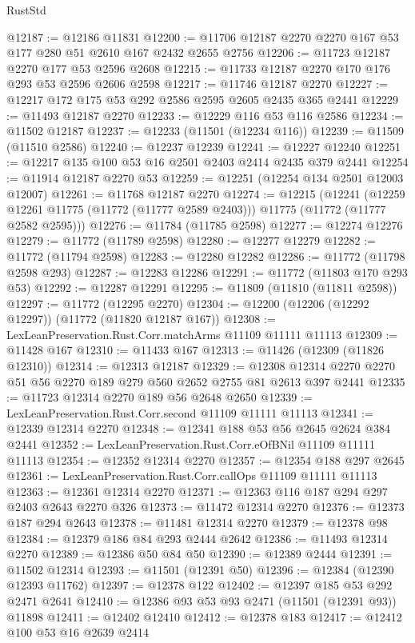 \begin{lexlean}{RustStd}
\begin{coremodule}
@12187 := @12186 @11831
@12200 := @11706 @12187 @2270 @2270 @167 @53 @177 @280 @51 @2610 @167 @2432 @2655 @2756
@12206 := @11723 @12187 @2270 @177 @53 @2596 @2608
@12215 := @11733 @12187 @2270 @170 @176 @293 @53 @2596 @2606 @2598
@12217 := @11746 @12187 @2270
@12227 := @12217 @172 @175 @53 @292 @2586 @2595 @2605 @2435 @365 @2441
@12229 := @11493 @12187 @2270
@12233 := @12229 @116 @53 @116 @2586
@12234 := @11502 @12187
@12237 := @12233 (@11501 (@12234 @116))
@12239 := @11509 (@11510 @2586)
@12240 := @12237 @12239
@12241 := @12227 @12240
@12251 := @12217 @135 @100 @53 @16 @2501 @2403 @2414 @2435 @379 @2441
@12254 := @11914 @12187 @2270 @53
@12259 := @12251 (@12254 @134 @2501 @12003 @12007)
@12261 := @11768 @12187 @2270
@12274 := @12215
    (@12241
      (@12259 @12261 @11775 (@11772 (@11777 @2589 @2403)))
      @11775
      (@11772 (@11777 @2582 @2595)))
@12276 := @11784 (@11785 @2598)
@12277 := @12274 @12276
@12279 := @11772 (@11789 @2598)
@12280 := @12277 @12279
@12282 := @11772 (@11794 @2598)
@12283 := @12280 @12282
@12286 := @11772 (@11798 @2598 @293)
@12287 := @12283 @12286
@12291 := @11772 (@11803 @170 @293 @53)
@12292 := @12287 @12291
@12295 := @11809 (@11810 (@11811 @2598))
@12297 := @11772 (@12295 @2270)
@12304 := @12200 (@12206 (@12292 @12297)) (@11772 (@11820 @12187 @167))
@12308 := LexLeanPreservation.Rust.Corr.matchArms @11109 @11111 @11113
@12309 := @11428 @167
@12310 := @11433 @167
@12313 := @11426 (@12309 (@11826 @12310))
@12314 := @12313 @12187
@12329 := @12308 @12314 @2270 @2270 @51 @56 @2270 @189 @279 @560 @2652 @2755 @81 @2613 @397 @2441
@12335 := @11723 @12314 @2270 @189 @56 @2648 @2650
@12339 := LexLeanPreservation.Rust.Corr.second @11109 @11111 @11113
@12341 := @12339 @12314 @2270
@12348 := @12341 @188 @53 @56 @2645 @2624 @384 @2441
@12352 := LexLeanPreservation.Rust.Corr.eOfBNil @11109 @11111 @11113
@12354 := @12352 @12314 @2270
@12357 := @12354 @188 @297 @2645
@12361 := LexLeanPreservation.Rust.Corr.callOps @11109 @11111 @11113
@12363 := @12361 @12314 @2270
@12371 := @12363 @116 @187 @294 @297 @2403 @2643 @2270 @326
@12373 := @11472 @12314 @2270
@12376 := @12373 @187 @294 @2643
@12378 := @11481 @12314 @2270
@12379 := @12378 @98
@12384 := @12379 @186 @84 @293 @2444 @2642
@12386 := @11493 @12314 @2270
@12389 := @12386 @50 @84 @50
@12390 := @12389 @2444
@12391 := @11502 @12314
@12393 := @11501 (@12391 @50)
@12396 := @12384 (@12390 @12393 @11762)
@12397 := @12378 @122
@12402 := @12397 @185 @53 @292 @2471 @2641
@12410 := @12386 @93 @53 @93 @2471 (@11501 (@12391 @93)) @11898
@12411 := @12402 @12410
@12412 := @12378 @183
@12417 := @12412 @100 @53 @16 @2639 @2414

\end{coremodule}
\end{lexlean}
